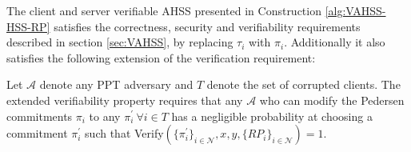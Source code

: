 \begin{thm}
\label{thm:VAHSS_RP_CSV}
\vspace{10pt}
The client and server verifiable AHSS presented in Construction \ref{alg:VAHSS-HSS-RP} satisfies the correctness, security and verifiability requirements described in section \ref{sec:VAHSS}, by replacing $\tau_i$ with $\pi_i$. Additionally it also satisfies the following extension of the verification requirement:

Let $\mathcal{A}$ denote any PPT adversary and $T$ denote the set of corrupted clients. The extended verifiability property requires that any $\mathcal{A}$ who can modify the Pedersen commitments $\pi_i$  to any $\pi_i^{'} \:\forall  i\in T$ has a negligible probability at choosing a commitment $\pi_i^{'}$ such that Verify$( \{\pi^{'}_i\}_{i\in\mathcal{N}},x,y,\{RP_i\}_{i\in\mathcal{N}})=1$.




\end{thm}
